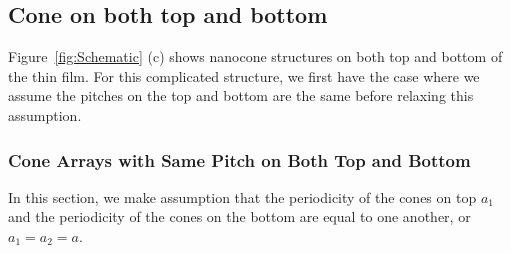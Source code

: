 \documentclass[12pt]{article}
\numberwithin{equation}{section}
\numberwithin{equation}{section}
\begin{document}
\subsection{Cone on both top and bottom}
Figure~\ref{fig:Schematic} (c) shows nanocone structures on both top and bottom of the thin film. For this complicated structure, we first have the case where we assume the pitches on the top and bottom are the same before relaxing this assumption.  
\subsubsection{Cone Arrays  with Same Pitch on Both Top and Bottom}
In this section, we make assumption that the periodicity of the cones on top $a_1$ and the periodicity of the cones on the bottom are equal to one another, or $a_1 = a_2 = a$.   
\end{document}
